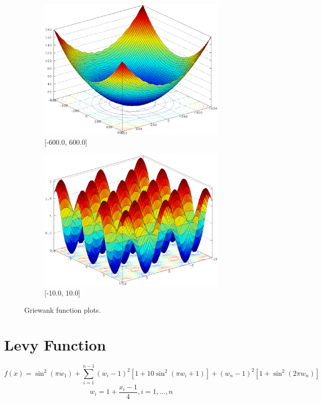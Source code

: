 \documentclass[12pt, a4paper]{article}
\begin{document}
		\begin{figure}[ht]
			\begin{subfigure}{0.49\textwidth}
				\includegraphics[width=\linewidth]{Images/Griewank_large}
				\caption{[-600.0, 600.0]}
			\end{subfigure}
			\begin{subfigure}{0.49\textwidth}
				\includegraphics[width=\linewidth]{Images/Griewank_small}
				\caption{[-10.0, 10.0]}
			\end{subfigure}
			\caption{Griewank function plots.}
		\end{figure}

	\newpage

	\section*{Levy Function}
		\begin{equation*}
			f(x)=\sin^2(\pi w_1)+\sum\limits_{i=1}^{n-1}(w_i-1)^2[1+10\sin^2(\pi w_i+1)]+(w_n-1)^2[1+\sin^2(2\pi w_n)]
		\end{equation*}
		\begin{equation*}
			w_i=1+\frac{x_i - 1}{4}, i=1,\dots,n
		\end{equation*}
\end{document}
